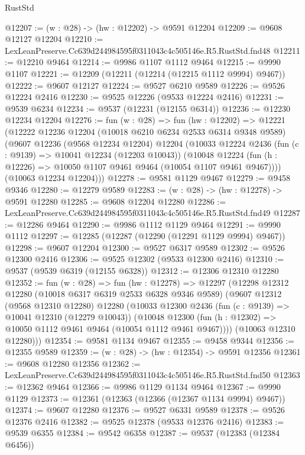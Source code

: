 \begin{lexlean}{RustStd}
\begin{coremodule}
@12207 := (w : @28) -> (hw : @12202) -> @9591 @12204
@12209 := @9608 @12127 @12204
@12210 := LexLeanPreserve.Cc639d244984595f0311043c4c505146e.R5.RustStd.fnd48
@12211 := @12210 @9464
@12214 := @9986 @1107 @1112 @9464
@12215 := @9990 @1107
@12221 := @12209 (@12211 (@12214 (@12215 @1112 @9994) @9467))
@12222 := @9607 @12127
@12224 := @9527 @6210 @9589
@12226 := @9526 @12224 @2416
@12230 := @9525 @12226 (@9533 @12224 @2416)
@12231 := @9539 @6234
@12234 := @9537 (@12231 (@12155 @6314))
@12236 := @12230 @12234 @12204
@12276 := fun (w : @28) =>
  fun (hw : @12202) =>
  @12221
    (@12222
      @12236
      @12204
      (@10018 @6210 @6234 @2533 @6314 @9348 @9589)
      (@9607
        @12236
        (@9568 @12234 @12204)
        @12204
        (@10033
          @12224
          @2436
          (fun (c : @9139) => @10041 @12234 (@12203 @10043))
          (@10048 @12224 (fun (h : @12226) => @10050 @1107 @9461 @9464 (@10054 @1107 @9461 @9467))))
        (@10063 @12234 @12204)))
@12278 := @9581 @1129 @9467
@12279 := @9458 @9346
@12280 := @12279 @9589
@12283 := (w : @28) -> (hw : @12278) -> @9591 @12280
@12285 := @9608 @12204 @12280
@12286 := LexLeanPreserve.Cc639d244984595f0311043c4c505146e.R5.RustStd.fnd49
@12287 := @12286 @9464
@12290 := @9986 @1112 @1129 @9464
@12291 := @9990 @1112
@12297 := @12285 (@12287 (@12290 (@12291 @1129 @9994) @9467))
@12298 := @9607 @12204
@12300 := @9527 @6317 @9589
@12302 := @9526 @12300 @2416
@12306 := @9525 @12302 (@9533 @12300 @2416)
@12310 := @9537 (@9539 @6319 (@12155 @6328))
@12312 := @12306 @12310 @12280
@12352 := fun (w : @28) =>
  fun (hw : @12278) =>
  @12297
    (@12298
      @12312
      @12280
      (@10018 @6317 @6319 @2533 @6328 @9346 @9589)
      (@9607
        @12312
        (@9568 @12310 @12280)
        @12280
        (@10033
          @12300
          @2436
          (fun (c : @9139) => @10041 @12310 (@12279 @10043))
          (@10048 @12300 (fun (h : @12302) => @10050 @1112 @9461 @9464 (@10054 @1112 @9461 @9467))))
        (@10063 @12310 @12280)))
@12354 := @9581 @1134 @9467
@12355 := @9458 @9344
@12356 := @12355 @9589
@12359 := (w : @28) -> (hw : @12354) -> @9591 @12356
@12361 := @9608 @12280 @12356
@12362 := LexLeanPreserve.Cc639d244984595f0311043c4c505146e.R5.RustStd.fnd50
@12363 := @12362 @9464
@12366 := @9986 @1129 @1134 @9464
@12367 := @9990 @1129
@12373 := @12361 (@12363 (@12366 (@12367 @1134 @9994) @9467))
@12374 := @9607 @12280
@12376 := @9527 @6331 @9589
@12378 := @9526 @12376 @2416
@12382 := @9525 @12378 (@9533 @12376 @2416)
@12383 := @9539 @6355
@12384 := @9542 @6358
@12387 := @9537 (@12383 (@12384 @6456))

\end{coremodule}
\end{lexlean}
